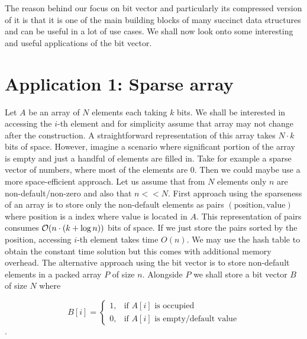 The reason behind our focus on bit vector and particularly its compressed version of it
is that it is one of the main building blocks of many succinct data structures and can be
useful in a lot of use cases. We shall now look onto some interesting and useful applications
of the bit vector.


\section{Application 1: Sparse array}

Let $A$ be an array of $N$ elements each taking $k$ bits. We shall be interested in
accessing the $i$-th element and for simplicity assume that array may not change
after the construction. A straightforward representation of this array takes $N\cdot k$
bits of space. However, imagine a scenario where significant portion of the array is empty
and just a handful of elements are filled in. Take for example a sparse vector of numbers,
where most of the elements are 0. Then we could maybe use a more space-efficient approach.
Let us assume that from $N$ elements only $n$ are non-default/non-zero and also that $n<<N$.
First approach using the sparseness of an array is to store only the non-default elements as
pairs $(\text{position}, \text{value})$ where $\text{position}$ is a index where $\text{value}$
is located in $A$. This representation of pairs consumes $\mathcal{O}(n\cdot (k+\log n))$ bits of space.
If we just store the pairs sorted by the position, accessing $i$-th element takes time $O(n)$.
We may use the hash table to obtain the constant time solution but this comes with additional
memory overhead. The alternative approach using the bit vector is to store non-default elements in
a packed array $P$ of size $n$. Alongside $P$ we shall store a bit vector $B$ of size $N$ where

\[
   B[i]=
\begin{cases}
   1,& \text{if $A[i]$ is occupied} \\
   0,& \text{if $A[i]$ is empty/default value}
\end{cases}
\].

